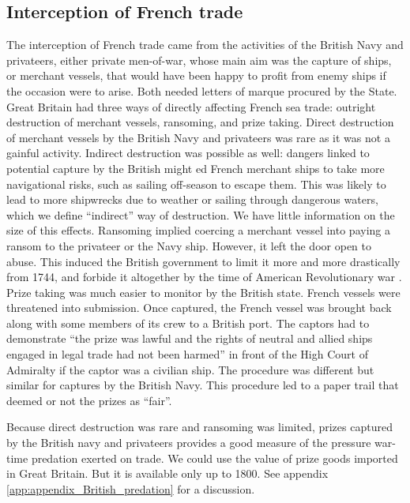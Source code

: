 \documentclass[12pt,a4paper,notitlepage,english]{article}
\begin{document}
\subsection{Interception of French trade}

The interception of French trade came from the activities of the British Navy and privateers, either private men-of-war, whose main aim was the capture of ships, or merchant vessels, that would have been happy to profit from enemy ships if the occasion were to arise.
Both needed letters of marque procured by the State.
Great Britain had three ways of directly affecting French sea trade: outright destruction of merchant vessels, ransoming, and prize taking.
Direct destruction of merchant vessels by the British Navy and privateers was rare as it was not a gainful activity.
Indirect destruction was possible as well: dangers linked to potential capture by the British might ed French merchant ships to take more navigational risks, such as sailing off-season to escape them.
This was likely to lead to more shipwrecks due to weather or sailing through dangerous waters, which we define ``indirect'' way of destruction.
We have little information on the size of this effects.
Ransoming implied coercing a merchant vessel into paying a ransom to the privateer or the Navy ship.
However, it left the door open to abuse.
This induced the British government to limit it more and more drastically from 1744, and forbide it altogether by the time of American Revolutionary war \cite[see][p. 734]{Hillmann2011}.
Prize taking was much easier to monitor by the British state.
French vessels were threatened into submission.
Once captured, the French vessel was brought back along with some members of its crew to a British port.
The captors had to demonstrate ``the prize was lawful and the rights of neutral and allied ships engaged in legal trade had not been harmed'' \cite[see][p. 734]{Hillmann2011} in front of the High Court of Admiralty if the captor was a civilian ship.
The procedure was different but similar for captures by the British Navy.
This procedure led to a paper trail that deemed or not the prizes as ``fair''.

Because direct destruction was rare and ransoming was limited, prizes captured by the British navy and privateers provides a good measure of the pressure war-time predation exerted on trade.
We could use the value of prize goods imported in Great Britain.
But it is available only up to 1800.
See appendix \ref{app:appendix_British_predation} for a discussion.
\end{document}
